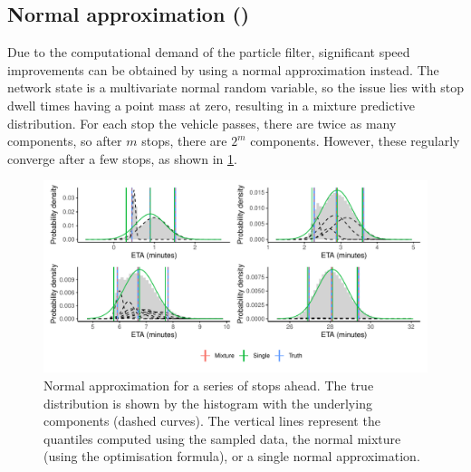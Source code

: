\subsection{Normal approximation (\Fnorm{})}
\label{sec:prediction_arrival_time_normal}

Due to the computational demand of the particle filter, significant speed improvements can be obtained by using a normal approximation instead. The network state is a multivariate normal random variable, so the issue lies with stop dwell times having a point mass at zero, resulting in a mixture predictive distribution. For each stop the vehicle passes, there are twice as many components, so after $m$ stops, there are $2^m$ components. However, these regularly converge after a few stops, as shown in \cref{fig:normal_approx}.

\begin{knitrout}\small
{}\color{fgcolor}\begin{figure}

{\centering \includegraphics[width=\textwidth]{figure/normal_approx-1} 

}

\caption[Normal approximation for a series of stops ahead]{Normal approximation for a series of stops ahead. The true distribution is shown by the histogram with the underlying components (dashed curves). The vertical lines represent the quantiles computed using the sampled data, the normal mixture (using the optimisation formula), or a single normal approximation.}\label{fig:normal_approx}
\end{figure}


\end{knitrout}

